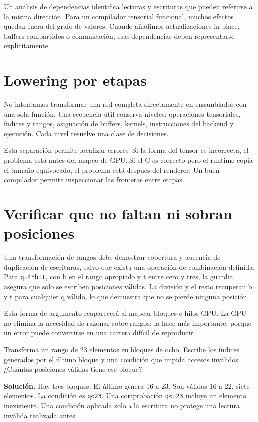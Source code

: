 \documentclass[12pt,a4paper,oneside]{report}
\begin{document}
Un análisis de dependencias identifica lecturas y escrituras que pueden referirse a la misma dirección. Para un compilador tensorial funcional, muchos efectos quedan fuera del grafo de valores. Cuando añadimos actualizaciones in-place, buffers compartidos o comunicación, esas dependencias deben representarse explícitamente.

\section{Lowering por etapas}
No intentamos transformar una red completa directamente en ensamblador con una sola función. Una secuencia útil conserva niveles: operaciones tensoriales, índices y rangos, asignación de buffers, kernels, instrucciones del backend y ejecución. Cada nivel resuelve una clase de decisiones.

Esta separación permite localizar errores. Si la forma del tensor es incorrecta, el problema está antes del mapeo de GPU. Si el C es correcto pero el runtime copia el tamaño equivocado, el problema está después del renderer. Un buen compilador permite inspeccionar las fronteras entre etapas.

\section{Verificar que no faltan ni sobran posiciones}
Una transformación de rangos debe demostrar cobertura y ausencia de duplicación de escrituras, salvo que exista una operación de combinación definida. Para \texttt{q=4*b+t}, con b en el rango apropiado y t entre cero y tres, la guardia asegura que solo se escriben posiciones válidas. La división y el resto recuperan b y t para cualquier q válido, lo que demuestra que no se pierde ninguna posición.

Esta forma de argumento reaparecerá al mapear bloques e hilos GPU. La GPU no elimina la necesidad de razonar sobre rangos: la hace más importante, porque un error puede convertirse en una carrera difícil de reproducir.

\begin{practica}
Transforma un rango de 23 elementos en bloques de ocho. Escribe los índices generados por el último bloque y una condición que impida accesos inválidos. ¿Cuántas posiciones válidas tiene ese bloque?

\end{practica}
\textbf{Solución.} Hay tres bloques. El último genera 16 a 23. Son válidos 16 a 22, siete elementos. La condición es \texttt{q<23}. Una comprobación \texttt{q<=23} incluye un elemento inexistente. Una condición aplicada solo a la escritura no protege una lectura inválida realizada antes.
\end{document}

